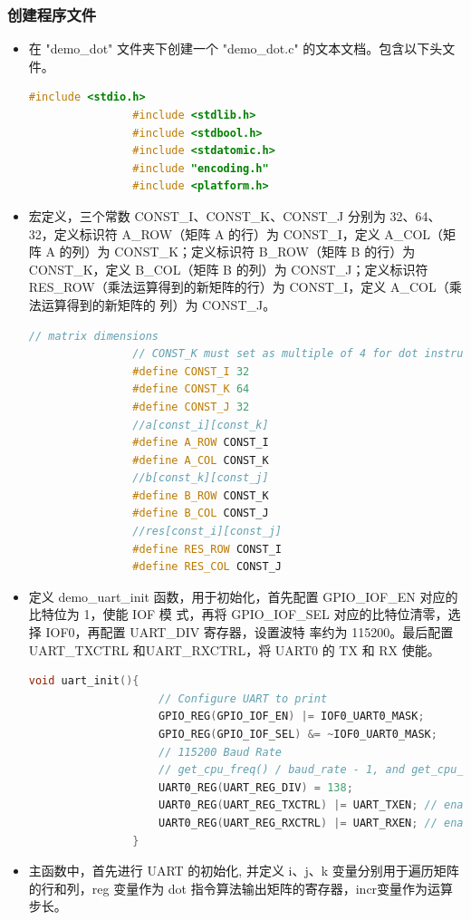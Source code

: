 \documentclass[a4paper, 14pt, oneside]{book} %
\numberwithin{equation}{subsection}
\begin{document}
		\subsubsection{创建程序文件}
		\begin{itemize}
			\item 在 "demo\_dot" 文件夹下创建一个 "demo\_dot.c" 的文本文档。包含以下头文件。
			\begin{lstlisting}[language={C++}]
				#include <stdio.h>
				#include <stdlib.h>
				#include <stdbool.h>
				#include <stdatomic.h>
				#include "encoding.h"
				#include <platform.h>  
			\end{lstlisting}
			\item 宏定义，三个常数 CONST\_I、CONST\_K、CONST\_J 分别为 32、64、32，定义标识符
			A\_ROW（矩阵 A 的行）为 CONST\_I，定义 A\_COL（矩阵 A 的列）为 CONST\_K；定义标识符
			B\_ROW（矩阵 B 的行）为 CONST\_K，定义 B\_COL（矩阵 B 的列）为 CONST\_J；定义标识符
			RES\_ROW（乘法运算得到的新矩阵的行）为 CONST\_I，定义 A\_COL（乘法运算得到的新矩阵的
			列）为 CONST\_J。
			\begin{lstlisting}[language={C++}]
				// matrix dimensions
				// CONST_K must set as multiple of 4 for dot instruction
				#define CONST_I 32
				#define CONST_K 64
				#define CONST_J 32
				//a[const_i][const_k]
				#define A_ROW CONST_I
				#define A_COL CONST_K
				//b[const_k][const_j]
				#define B_ROW CONST_K
				#define B_COL CONST_J
				//res[const_i][const_j]
				#define RES_ROW CONST_I
				#define RES_COL CONST_J  
			\end{lstlisting}
			\item 定义 demo\_uart\_init 函数，用于初始化，首先配置 GPIO\_IOF\_EN 对应的比特位为 1，使能 IOF 模
			式，再将 GPIO\_IOF\_SEL 对应的比特位清零，选择 IOF0，再配置 UART\_DIV 寄存器，设置波特
			率约为 115200。最后配置 UART\_TXCTRL 和UART\_RXCTRL，将 UART0 的 TX 和 RX 使能。
			\begin{lstlisting}[language={C++}]
				void uart_init(){
					// Configure UART to print
					GPIO_REG(GPIO_IOF_EN) |= IOF0_UART0_MASK;
					GPIO_REG(GPIO_IOF_SEL) &= ~IOF0_UART0_MASK;
					// 115200 Baud Rate
					// get_cpu_freq() / baud_rate - 1, and get_cpu_freq() = 16MHz
					UART0_REG(UART_REG_DIV) = 138;
					UART0_REG(UART_REG_TXCTRL) |= UART_TXEN; // enable tx
					UART0_REG(UART_REG_RXCTRL) |= UART_RXEN; // enable rx
				}
			\end{lstlisting}
			\item 主函数中，首先进行 UART 的初始化, 并定义 i、j、k 变量分别用于遍历矩阵的行和列，reg 变量作为 dot 指令算法输出矩阵的寄存器，incr变量作为运算步长。

\end{itemize}
\end{document}
